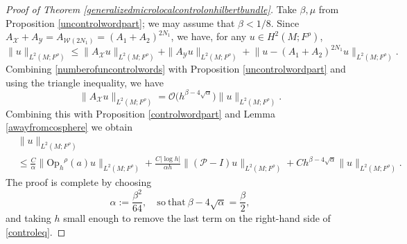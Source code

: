\documentclass[11pt,oneside,reqno]{amsart}
\newcommand\Oph{\ensuremath{\mathrm{Op}_h}}
\theoremstyle{definition}
\numberwithin{equation}{section}
\theoremstyle{plain}
\begin{document}
\begin{proof}[Proof of Theorem \ref{generalizedmicrolocalcontrolonhilbertbundle}] Take $\beta, \mu$ from Proposition \ref{uncontrolwordpart}; we may assume that $\beta<1 / 8$. Since $A_{\mathcal{X}}+A_{\mathcal{Y}}=A_{\mathcal{W}(2 N_1)}=(A_1+A_2)^{2 N_1}$, we have, for any $u \in H^2(M;F^{\rho})$,
\begin{equation*}
    \|u\|_{L^2(M;F^{\rho})} \leq\|A_{\mathcal{X}} u\|_{L^2(M;F^{\rho})}+\|A_{\mathcal{Y}} u\|_{L^2(M;F^{\rho})}+ \big\|u-(A_1+A_2)^{2 N_1} u \big\|_{L^2(M;F^{\rho})} .
\end{equation*}
Combining \eqref{numberofuncontrolwords} with Proposition \ref{uncontrolwordpart} and using the triangle inequality, we have
\begin{equation*}
    \|A_{\mathcal{X}} u\|_{L^2(M;F^{\rho})}=\mathcal{O}\big(h^{\beta-4 \sqrt{\alpha}}\big)\|u\|_{L^2(M;F^{\rho})} .
\end{equation*}
Combining this with Proposition \ref{controlwordpart} and Lemma \ref{awayfromcosphere} we obtain
\begin{equation}\label{controleq}
\begin{aligned}
    &\|u\|_{L^2(M;F^{\rho})} \\
    &\leq \frac{C}{\alpha}\|\Oph^{\rho}(a) u\|_{L^2(M;F^{\rho})}+\frac{C|\log h|}{\alpha h}\|(\mathcal{P} -I) u\|_{L^2(M;F^{\rho})}+Ch^{\beta-4 \sqrt{\alpha}} \|u\|_{L^2(M;F^{\rho})}.
\end{aligned}
\end{equation}
The proof is complete by choosing 
\begin{equation}\label{choicealpha}
    \alpha:=\frac{\beta^2}{64}, \quad \mathrm{so\ that\ }\beta-4 \sqrt{\alpha}=\frac{\beta}{2},
\end{equation}
and taking $h$ small enough to remove the last term on the right-hand side of \eqref{controleq}.
\end{proof}
\end{document}

